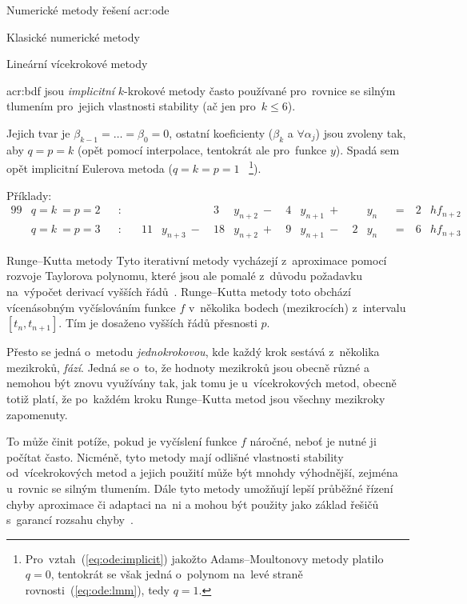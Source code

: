 \documentclass[thesis=M,czech]{FITthesis}[2012/06/26]
\newcommand{\acrlabel}[1]{acr:#1}
\newcommand{\acr}[1]{\acrshort{\acrlabel{#1}}}
\newcommand{\acrf}[1]{\acrfull{\acrlabel{#1}}}
\newcommand{\hl}[1]{\textit{#1}}
\newcommand{\name}[1]{\hl{#1}}
\newcommand{\cit}[1]{\cite{#1}}
\newcommand{\rf}[1]{\ref{#1}}
\newcommand{\rfeq}[1]{(\rf{eq:#1})}
\begin{document}
\begin{section}{Numerické metody řešení \acr{ode}}
\begin{subsection}{Klasické numerické metody}
\begin{subsubsection}{Lineární vícekrokové metody}

\begin{paragraph}{\acrf{bdf}}\label{p:search:ode:classic:lmm:bdf}
jsou \hl{implicitní} $k$-krokové metody často používané
pro~rovnice se silným tlumením
pro~jejich vlastnosti stability
(ač jen pro~${k \leq 6}$).

Jejich tvar je
${\beta_{k-1} = \dots} = {\beta_{0} = 0}$,
ostatní koeficienty ($\beta_{k}$ a ${\forall \alpha_{j}}$)
jsou zvoleny tak, aby ${q = p = k}$
(opět pomocí interpolace,
tentokrát ale pro~funkce $y$).
Spadá sem opět implicitní Eulerova metoda
(${q = k = p = 1}$~%
\footnote{Pro~vztah~\rfeq{ode:implicit}
jakožto Adams--Moultonovy metody platilo ${q = 0}$,
tentokrát se však jedná o~polynom na~levé straně rovnosti~\rfeq{ode:lmm},
tedy ${q = 1}$.}).

Příklady:
\begin{alignat*}{99}
   &q = k~= p = 2&&: \quad &    &               &  3 & y_{n+2} \:-\:
      & 4 & y_{n+1} \:+\: &   & y_{n} &&= \: & 2 & h f_{n+2} \\
   &q = k~= p = 3&&: \quad & 11 & y_{n+3} \:-\: & 18 & y_{n+2} \:+\:
      & 9 & y_{n+1} \:-\: & 2 & y_{n} &&= \: & 6 & h f_{n+3}
\end{alignat*}
\end{paragraph} %


\end{subsubsection} %


\begin{subsubsection}{Runge--Kutta metody}\label{sss:search:ode:classic:rk}
Tyto iterativní metody vycházejí z~aproximace
pomocí rozvoje Taylorova polynomu,
které jsou ale pomalé z~důvodu požadavku
na~výpočet derivací vyšších řádů~\cit{ode-nsolve-book}.
Runge--Kutta metody toto obchází
vícenásobným vyčíslováním funkce $f$
v~několika bodech (mezikrocích)
z~intervalu $[t_{n}, t_{n+1}]$.
Tím je dosaženo vyšších řádů přesnosti $p$.

Přesto se jedná o~metodu \hl{jednokrokovou},
kde každý krok sestává z~několika mezikroků, \name{fází}.
Jedná se o~to,
že hodnoty mezikroků jsou obecně různé
a nemohou být znovu využívány tak,
jak tomu je u~vícekrokových metod,
obecně totiž platí,
že po~každém kroku Runge--Kutta metod
jsou všechny mezikroky zapomenuty.

To může činit potíže,
pokud je vyčíslení funkce $f$ náročné,
neboť je nutné ji počítat často.
Nicméně, tyto metody
mají odlišné vlastnosti stability
od~vícekrokových metod
a jejich použití může být mnohdy výhodnější,
zejména u~rovnic se silným tlumením.
Dále tyto metody umožňují lepší průběžné řízení chyby aproximace
či adaptaci na~ni
a mohou být použity jako základ
řešičů s~garancí rozsahu chyby~\cit{ode-valid-runge_kutta-art}.


\end{subsubsection}
\end{subsection}
\end{section}
\end{document}
